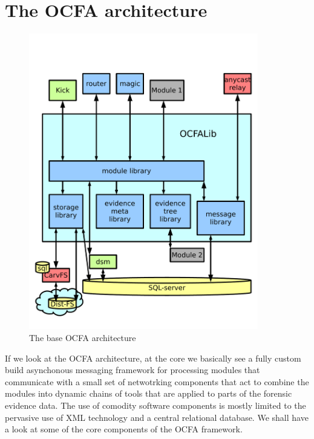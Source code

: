 \section{The OCFA architecture}
\begin{figure}
\centering
\includegraphics[width=100mm]{mattock/libraryview.pdf}
\caption{The base OCFA architecture}
\label{fig:FlowInOut}
\end{figure}
If we look at the OCFA architecture, at the core we basically see a fully custom build asynchonous messaging framework for processing modules that communicate with a small set of netwotrking components that act to combine the modules into dynamic chains of tools that are applied to parts of the forensic evidence data. The use of comodity software components is mostly limited to the pervasive use of XML technology and a central relational database. We shall have a look at some of the core components of the OCFA framework.
